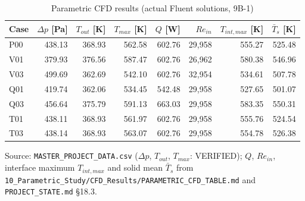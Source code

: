 \begin{table}[htbp]
\centering
\footnotesize
\caption{Parametric CFD results (actual Fluent solutions, 9B-1)}
\label{tab:pcfd}
\begin{tabular}{lrrrrrrr}
\toprule
Case & $\Delta p$ [Pa] & $T_{out}$ [K] & $T_{max}$ [K] & $Q$ [W] & $Re_{in}$ & $T_{int,max}$ [K] & $\bar T_s$ [K] \\
\midrule
P00 & 438.13 & 368.93 & 562.58 & 602.76 & 29,958 & 555.27 & 525.48 \\
V01 & 379.93 & 376.56 & 587.47 & 602.76 & 26,962 & 580.38 & 546.96 \\
V03 & 499.69 & 362.69 & 542.10 & 602.76 & 32,954 & 534.61 & 507.78 \\
Q01 & 419.74 & 362.06 & 534.45 & 542.48 & 29,958 & 527.65 & 501.07 \\
Q03 & 456.64 & 375.79 & 591.13 & 663.03 & 29,958 & 583.35 & 550.31 \\
T01 & 438.11 & 368.93 & 561.97 & 602.76 & 29,958 & 555.76 & 524.54 \\
T03 & 438.14 & 368.93 & 563.07 & 602.76 & 29,958 & 554.78 & 526.38 \\
\bottomrule
\end{tabular}
\par\smallskip\parbox{\linewidth}{\footnotesize\raggedright Source: \texttt{MASTER\_PROJECT\_DATA.csv} ($\Delta p$, $T_{out}$, $T_{max}$: VERIFIED); $Q$, $Re_{in}$, interface maximum $T_{int,max}$ and solid mean $\bar T_s$ from \texttt{10\_Parametric\_Study/CFD\_Results/PARAMETRIC\_CFD\_TABLE.md} and \texttt{PROJECT\_STATE.md} \S18.3.}
\end{table}

